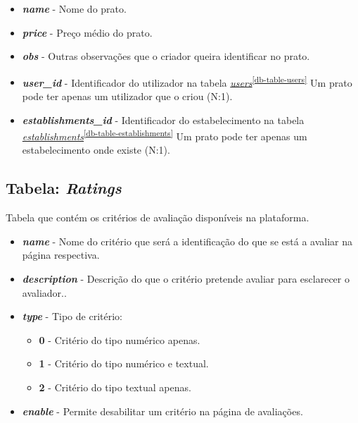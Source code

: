 \documentclass[11pt, a4paper, sans]{article}
\begin{document}
	\begin{itemize}
		\item \textbf{\textit{name}} - Nome do prato.
		\item \textbf{\textit{price}} - Preço médio do prato.
		\item \textbf{\textit{obs}} - Outras observações que o criador queira identificar no prato.
		\item \textbf{\textit{user\_id}} - Identificador do utilizador na tabela 
			\underline{\textit{users}}\textsuperscript{\ref{db-table-users}} 
			Um prato pode ter apenas um utilizador que o criou (N:1).
		\item \textbf{\textit{establishments\_id}} - Identificador do estabelecimento na tabela 
			\underline{\textit{establishments}}\textsuperscript{\ref{db-table-establishments}} 
			Um prato pode ter apenas um estabelecimento onde existe (N:1).
	\end{itemize}

	\subsection{Tabela: \textit{Ratings}} \label{db-table-ratings}

	Tabela que contém os critérios de avaliação disponíveis na plataforma.

	\begin{itemize}
		\item \textbf{\textit{name}} - Nome do critério que será a identificação do que se está a avaliar
			na página respectiva.
		\item \textbf{\textit{description}} - Descrição do que o critério pretende avaliar para esclarecer
			o avaliador..
		\item \textbf{\textit{type}} - Tipo de critério:
			\begin{itemize}
				\item \textbf{0} - Critério do tipo numérico apenas.
				\item \textbf{1} - Critério do tipo numérico e textual.
				\item \textbf{2} - Critério do tipo textual apenas.
			\end{itemize}
		\item \textbf{\textit{enable}} - Permite desabilitar um critério na página de avaliações.
	\end{itemize}
\end{document}
